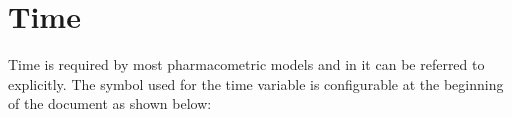 






\section{Time}
\label{sec:independent-var}

Time is required by most pharmacometric models and in \pharmml it can
be referred to explicitly. The symbol used for the time variable is
configurable at the beginning of the document as shown below:

